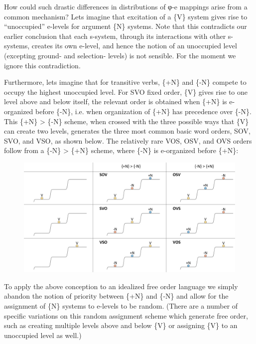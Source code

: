   How could such drastic differences in distributions of φ{}-e mappings arise from a common mechanism? Lets imagine that excitation of a \{V\} system gives rise to “unoccupied” e-levels for argument \{N\} systems. Note that this contradicts our earlier conclusion that each s-system, through its interactions with other s-systems, creates its own e-level, and hence the notion of an unoccupied level (excepting ground- and selection- levels) is not sensible. For the moment we ignore this contradiction.

  Furthermore, lets imagine that for transitive verbs, \{+N\} and \{-N\} compete to occupy the highest unoccupied level. For SVO fixed order, \{V\} gives rise to one level above and below itself, the relevant order is obtained when \{+N\} is e-organized before \{-N\}, i.e. when organization of \{+N\} has precedence over \{-N\}. This \{+N\} > \{-N\} scheme, when crossed with the three possible ways that \{V\} can create two levels, generates the three most common basic word orders, SOV, SVO, and VSO, as shown below. The relatively rare VOS, OSV, and OVS orders follow from a \{-N\} > \{+N\} scheme, where \{-N\} is e-organized before \{+N\}:

  
\begin{figure}
\includegraphics[width=\textwidth]{figures/Tilsen-img75.png}
\caption{\missingcaption}
\label{fig:}
\end{figure}
 

  To apply the above conception to an idealized free order language we simply abandon the notion of priority between \{+N\} and \{-N\} and allow for the assignment of \{N\} systems to e-levels to be random. (There are a number of specific variations on this random assignment scheme which generate free order, such as creating multiple levels above and below \{V\} or assigning \{V\} to an unoccupied level as well.)

